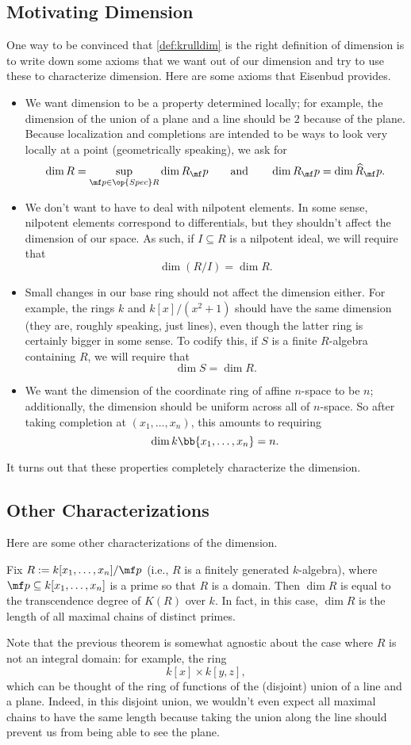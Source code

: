 \documentclass[../notes.tex]{subfiles}
\begin{document}
\subsection{Motivating Dimension}
One way to be convinced that \autoref{def:krulldim} is the right definition of dimension is to write down some axioms that we want out of our dimension and try to use these to characterize dimension. Here are some axioms that Eisenbud provides.
\begin{itemize}
	\item We want dimension to be a property determined locally; for example, the dimension of the union of a plane and a line should be $2$ because of the plane. Because localization and completions are intended to be ways to look very locally at a point (geometrically speaking), we ask for
	\[\dim R=\sup_{\mf p\in\op{Spec}R}\dim R_\mf p\qquad\text{and}\qquad\dim R_\mf p=\dim\widehat R_\mf p.\]
	\item We don't want to have to deal with nilpotent elements. In some sense, nilpotent elements correspond to differentials, but they shouldn't affect the dimension of our space. As such, if $I\subseteq R$ is a nilpotent ideal, we will require that
	\[\dim(R/I)=\dim R.\]
	\item Small changes in our base ring should not affect the dimension either. For example, the rings $k$ and $k[x]/\left(x^2+1\right)$ should have the same dimension (they are, roughly speaking, just lines), even though the latter ring is certainly bigger in some sense. To codify this, if $S$ is a finite $R$-algebra containing $R$, we will require that
	\[\dim S=\dim R.\]
	\item We want the dimension of the coordinate ring of affine $n$-space to be $n$; additionally, the dimension should be uniform across all of $n$-space. So after taking completion at $(x_1,\ldots,x_n)$, this amounts to requiring
	\[\dim k\bb{x_1,\ldots,x_n}=n.\]
\end{itemize}
It turns out that these properties completely characterize the dimension.

\subsection{Other Characterizations}
Here are some other characterizations of the dimension.
\begin{theorem}
	Fix $R:=k[x_1,\ldots,x_n]/\mf p$ (i.e., $R$ is a finitely generated $k$-algebra), where $\mf p\subseteq k[x_1,\ldots,x_n]$ is a prime so that $R$ is a domain. Then $\dim R$ is equal to the transcendence degree of $K(R)$ over $k$. In fact, in this case, $\dim R$ is the length of all maximal chains of distinct primes.
\end{theorem}
Note that the previous theorem is somewhat agnostic about the case where $R$ is not an integral domain: for example, the ring
\[k[x]\times k[y,z],\]
which can be thought of the ring of functions of the (disjoint) union of a line and a plane. Indeed, in this disjoint union, we wouldn't even expect all maximal chains to have the same length because taking the union along the line should prevent us from being able to see the plane.
\end{document}
